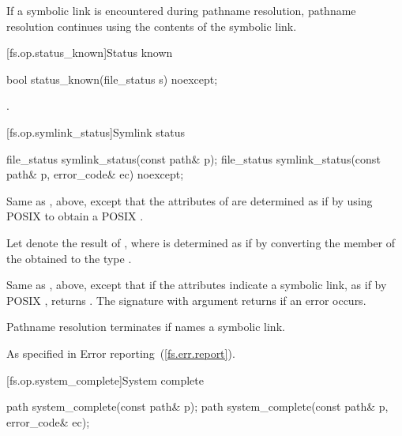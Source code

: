 \begin{itemdescr}
\pnum
\remarks If a symbolic link is encountered during pathname resolution,
      pathname resolution continues using the contents of the symbolic link.
\end{itemdescr}


[fs.op.status_known]{Status known}

%
\begin{itemdecl}
bool status_known(file_status s) noexcept;
\end{itemdecl}

\begin{itemdescr}
\pnum
\returns {}.
\end{itemdescr}


[fs.op.symlink_status]{Symlink status}

%
\begin{itemdecl}
file_status symlink_status(const path& p);
file_status symlink_status(const path& p, error_code& ec) noexcept;
\end{itemdecl}

\begin{itemdescr}
\pnum
\effects Same as , above,
  except that the attributes
    of  are determined as if by using POSIX 
    to obtain a POSIX .

\pnum
Let  denote the result of ,
where  is determined as if by converting the  member
of the obtained  to the type .

\pnum
\returns Same as , above, except
      that if the attributes indicate a symbolic link, as if by POSIX ,
      returns .
      The signature with argument  returns
       if an error occurs.

\pnum
\remarks Pathname resolution terminates if  names a symbolic link.

\pnum
\throws As specified in Error reporting~(\ref{fs.err.report}).
\end{itemdescr}


[fs.op.system_complete]{System complete}

%
\begin{itemdecl}
path system_complete(const path& p);
path system_complete(const path& p, error_code& ec);
\end{itemdecl}

